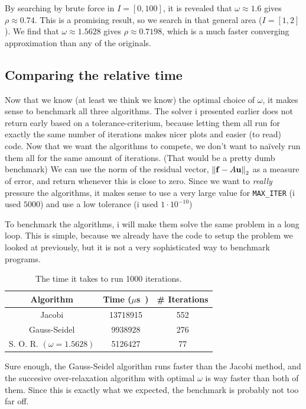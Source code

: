 \documentclass[12pt]{article}
\begin{document}
\begin{multicols}{2}
    By searching by brute force in $I = [0, 100]$,
    it is revealed that $\omega \approx 1.6$ gives $\rho \approx 0.74$.
    This is a promising result, so we search in that general area
    ($I = [1, 2]$). We find that $\omega \approx 1.5628$ gives
    $\rho \approx 0.7198$, which is a much faster converging
    approximation than any of the originals.

    \subsection{Comparing the relative time}
    Now that we know (at least we think we know) the optimal
    choice of $\omega$, it makes sense to benchmark all three algorithms.
    The solver i presented earlier does not return early based on a
    tolerance-criterium, because letting them all run for exactly the same
    number of iterations makes nicer plots and easier (to read) code.
    Now that we want the algorithms to compete, we don't want to na\"ively
    run them all for the same amount of iterations.
    (That would be a pretty dumb benchmark)
    We can use the norm of the residual vector,
    $\Norm[2]{\vec f - A \vec u}$ as a measure of error,
    and return whenever this is close to zero.
    Since we want to {\em really} pressure the algorithms,
    it makes sense to use a very large value for {\tt MAX\_ITER} (i used $5000$)
    and use a low tolerance (i used $1 \cdot 10^{-10}$)

    To benchmark the algorithms, i will make them solve the same
    problem in a long loop. This is simple, because we already have
    the code to setup the problem we looked at previously, but it
    is not a very sophisticated way to benchmark programs.
    \begin{table}[H]
        \centering
        \caption{The time it takes to run 1000 iterations.}
        \begin{tabular}{ccc}
            \hline\hline
            \bfseries Algorithm & \bfseries Time ($\mu$\si s) &\bfseries \# Iterations \\
            \hline
            Jacobi                       & 13718915 & 552\\
            Gauss-Seidel                 & 9938928 & 276 \\
            S. O. R. $(\omega = 1.5628)$ & 5126427 & 77 \\
            \hline
        \end{tabular}
        \label{table:rhos}
    \end{table}\noindent
    Sure enough, the Gauss-Seidel algorithm runs faster than the Jacobi
    method, and the succesive over-relaxation algorithm with optimal
    $\omega$ is way faster than both of them.
    Since this is exactly what we expected, the benchmark is probably
    not too far off.



\end{multicols}
\end{document}
